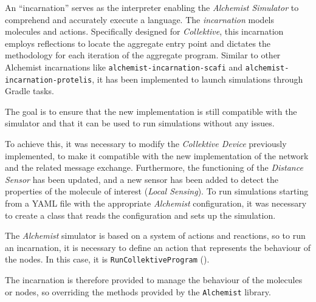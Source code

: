 An ``incarnation'' serves as the interpreter enabling the \emph{Alchemist Simulator} to comprehend and accurately execute a language.
The \emph{incarnation} models molecules and actions.
Specifically designed for \emph{Collektive}, this incarnation employs reflections to locate the aggregate entry point
and dictates the methodology for each iteration of the aggregate program.
Similar to other Alchemist incarnations like \texttt{alchemist-incarnation-scafi} and \texttt{alchemist-\\incarnation-protelis},
it has been implemented to launch simulations through Gradle tasks.

The goal is to ensure that the new implementation is still compatible with the simulator and that it can be used to run
simulations without any issues.

To achieve this, it was necessary to modify the \emph{Collektive Device} previously implemented, to make it compatible
with the new implementation of the network and the related message exchange.
Furthermore, the functioning of the \emph{Distance Sensor} has been updated, and a new sensor has been added to detect
the properties of the molecule of interest (\emph{Local Sensing}).
To run simulations starting from a YAML file with the appropriate \emph{Alchemist} configuration, it was necessary to
create a class that reads the configuration and sets up the simulation.

The \emph{Alchemist} simulator is based on a system of actions and reactions, so to run an incarnation, it is necessary
to define an action that represents the behaviour of the nodes.
In this case, it is \texttt{RunCollektiveProgram} ().

The incarnation is therefore provided to manage the behaviour of the molecules or nodes, so overriding the methods
provided by the \texttt{Alchemist} library.

